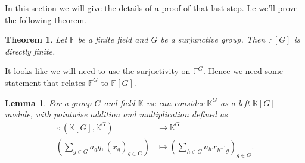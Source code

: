 \documentclass[titlepage, a4paper]{article}
\newcommand{\F}{\mathbb{F}}
\newtheorem{theorem}{Theorem}
\newtheorem{lemma}{Lemma}
\theoremstyle{remark}
\begin{document}
	In this section we will give the details of a proof of that last step. 
	I.e we'll prove the following theorem. 
	\begin{theorem}\label{thm:gottschalk_kaplansky}
		Let $\F$ be a finite field and $G$ be a surjunctive group. Then $\F[G]$ is directly finite. 
	\end{theorem}
	It looks like we will need to use the surjuctivity on $\F^{G}$. Hence we need some statement that relates $\F^{G}$ to $\F[G]$.
	\begin{lemma}
		For a group $G$ and field $\mathbb K$ we can consider $\mathbb{K}^{G}$ as a left $\mathbb{K}[G]$-module, with pointwise addition and multiplication defined as
		\begin{align*}
			\cdot : (\mathbb{K}[G] , \mathbb{K}^{G}) &\longrightarrow \mathbb{K}^{G} \\
		\left( \sum_{g \in G} a_g g,  (x_g)_{g \in G}\right)  &\longmapsto \left( \sum_{h \in G} a_h x_{h^{-1}g} \right)_{g \in G}
	.\end{align*} 
	\end{lemma}
\end{document}
